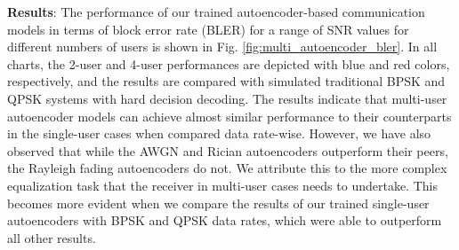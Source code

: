 \textbf{Results}: The performance of our trained autoencoder-based communication models in terms of block error rate (BLER) for a range of SNR values for different numbers of users is shown in Fig. \ref{fig:multi_autoencoder_bler}. In all charts, the 2-user and 4-user performances are depicted with blue and red colors, respectively, and the results are compared with simulated traditional BPSK and QPSK systems with hard decision decoding.
The results indicate that multi-user autoencoder models can achieve almost similar performance to their counterparts in the single-user cases when compared data rate-wise. However, we have also observed that while the AWGN and Rician autoencoders outperform their peers, the Rayleigh fading autoencoders do not. We attribute this to the more complex equalization task that the receiver in multi-user cases needs to undertake. This becomes more evident when we compare the results of our trained single-user autoencoders with BPSK and QPSK data rates, which were able to outperform all other results.


